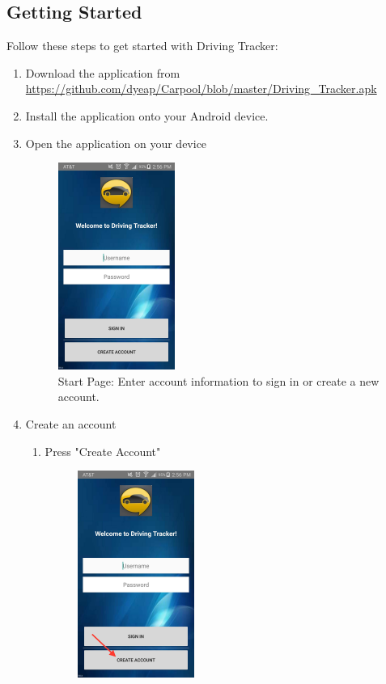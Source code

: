 \documentclass[12pt]{article}
\begin{document}
\subsection{Getting Started}
Follow these steps to get started with Driving Tracker: 
\begin{enumerate}
    \item Download the application from \url{https://github.com/dyeap/Carpool/blob/master/Driving_Tracker.apk}
    \item Install the application onto your Android device.
    \item Open the application on your device
        \begin{figure}[H]
            \centering
            \includegraphics[width=1.5in]{log_in.jpg} 
            \caption{Start Page: Enter account information to sign in or create a new account.}
            \label{log_in}
        \end{figure}
    \newpage
    \item Create an account
        \begin{enumerate}
            \item Press "Create Account"
                \begin{figure}[H]
                    \centering
                    \includegraphics[width=1.5in]{log_in-create_acc.jpg}

\end{figure}
\end{enumerate}
\end{enumerate}
\end{document}
